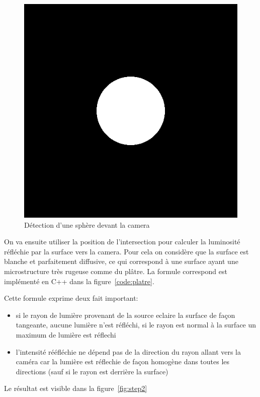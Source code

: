 \documentclass[12pt]{article}
\begin{document}
\begin{figure}
  \centering
  \includegraphics[width=12cm]{../result/step1}
  \caption{Détection d'une sphère devant la camera}\label{fig:step1}
\end{figure}

On va ensuite utiliser la position de l'intersection pour calculer la luminosité réfléchie par la surface vers la camera.
Pour cela on considère que la surface est blanche et parfaitement diffusive, ce qui correspond à une surface ayant une microstructure très rugeuse comme du plâtre.
La formule correspond est implémenté en C++ dans la figure~\ref{code:platre}.

Cette formule exprime deux fait important:
\begin{itemize}
    \item si le rayon de lumière provenant de la source eclaire la surface de façon tangeante, aucune lumière n'est réfléchi, si le rayon est normal à la surface un maximum de lumière est réflechi
    \item l'intensité rééfléchie ne dépend pas de la direction du rayon allant vers la caméra car la lumière est réflechie de façon homogène dans toutes les directions (sauf si le rayon est derrière la surface)
\end{itemize}

Le résultat est visible dans la figure~\ref{fig:step2}
\end{document}
